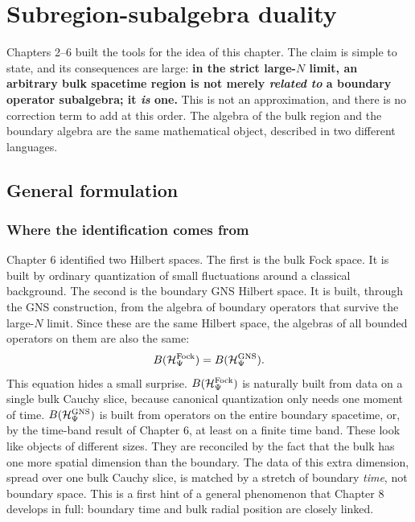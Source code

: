 \chapter{Subregion-subalgebra duality}

Chapters 2--6 built the tools for the idea of this chapter. The claim is simple to state, and its
consequences are large: \textbf{in the strict large-$N$ limit, an arbitrary bulk spacetime region is not
merely \emph{related to} a boundary operator subalgebra; it \emph{is} one.} This is not an approximation,
and there is no correction term to add at this order. The algebra of the bulk region and the boundary
algebra are the same mathematical object, described in two different languages.

\section{General formulation}

\subsection*{Where the identification comes from}

Chapter 6 identified two Hilbert spaces. The first is the bulk Fock space. It is built by ordinary
quantization of small fluctuations around a classical background. The second is the boundary GNS Hilbert
space. It is built, through the GNS construction, from the algebra of boundary operators that survive the
large-$N$ limit. Since these are the same Hilbert space, the algebras of all bounded operators on them are
also the same:
\begin{equation}
B(\mathcal{H}_\Psi^{\text{Fock}}) = B(\mathcal{H}_\Psi^{\text{GNS}}) .
\label{eq:full_algebra_identity}
\end{equation}
This equation hides a small surprise. $B(\mathcal{H}_\Psi^{\text{Fock}})$ is naturally built from data on a single
bulk Cauchy slice, because canonical quantization only needs one moment of time. $B(\mathcal{H}_\Psi^{\text{GNS}})$
is built from operators on the entire boundary spacetime, or, by the time-band result of Chapter 6, at least
on a finite time band. These look like objects of different sizes. They are reconciled by the fact that the
bulk has one more spatial dimension than the boundary. The data of this extra dimension, spread over one
bulk Cauchy slice, is matched by a stretch of boundary \emph{time}, not boundary space. This is a first hint
of a general phenomenon that Chapter 8 develops in full: boundary time and bulk radial position are closely
linked.

